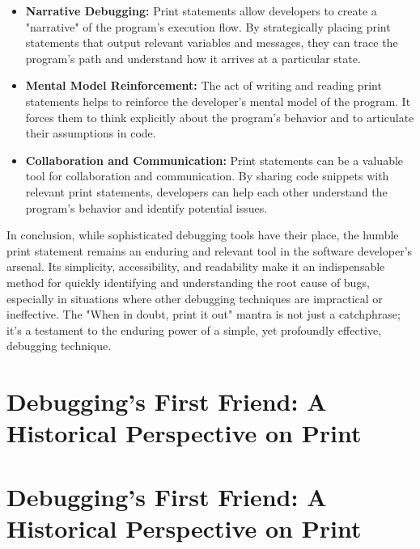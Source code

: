\documentclass{article}
\begin{document}
\begin{itemize}
    \item \textbf{Narrative Debugging:} Print statements allow developers to create a "narrative" of the program's execution flow. By strategically placing print statements that output relevant variables and messages, they can trace the program's path and understand how it arrives at a particular state.

    \item \textbf{Mental Model Reinforcement:}  The act of writing and reading print statements helps to reinforce the developer's mental model of the program.  It forces them to think explicitly about the program's behavior and to articulate their assumptions in code.

    \item \textbf{Collaboration and Communication:}  Print statements can be a valuable tool for collaboration and communication.  By sharing code snippets with relevant print statements, developers can help each other understand the program's behavior and identify potential issues.
\end{itemize}

In conclusion, while sophisticated debugging tools have their place, the humble print statement remains an enduring and relevant tool in the software developer's arsenal. Its simplicity, accessibility, and readability make it an indispensable method for quickly identifying and understanding the root cause of bugs, especially in situations where other debugging techniques are impractical or ineffective. The "When in doubt, print it out" mantra is not just a catchphrase; it's a testament to the enduring power of a simple, yet profoundly effective, debugging technique.

\newpage

\section*{Debugging's First Friend: A Historical Perspective on Print} %
\label{chapter-2-2-Debugging_s_First_Friend__A_Historical_P}

\section*{Debugging's First Friend: A Historical Perspective on Print}
\end{document}
